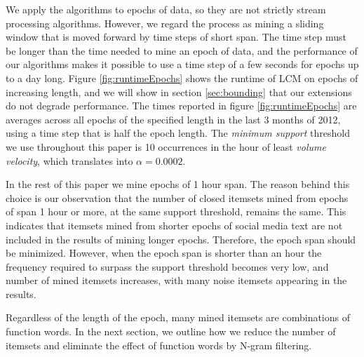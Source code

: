 \documentclass{sig-alternate}
\begin{document}
We apply the algorithms to epochs of data, so they are not strictly stream
processing algorithms.
However, we regard the process as mining a sliding window that is moved
forward by time steps of short span.
The time step must be longer than the time needed to mine an epoch of data,
and the performance of our algorithms makes it possible to use a time step
of a few seconds for epochs up to a day long.
Figure \ref{fig:runtimeEpochs} shows the runtime of LCM on epochs of
increasing length, and we will show in section \ref{sec:bounding} that our
extensions do not degrade performance.
The times reported in figure \ref{fig:runtimeEpochs} are averages across all
epochs of the specified length in the last 3 months of 2012, %
using a time step that is half the epoch length.
The \emph{minimum support} threshold we use throughout this paper
is 10 occurrences in the hour of least \emph{volume velocity},
which translates into $\alpha = 0.0002$.

In the rest of this paper we mine epochs of 1 hour span.
The reason behind this choice is our observation that the number of closed
itemsets mined from epochs of span 1 hour or more,
at the same support threshold, remains the same.
This indicates that itemsets mined from shorter epochs of social media text
are not included in the results of mining longer epochs. 
Therefore, the epoch span should be minimized.
However, when the epoch span is shorter than an hour the frequency required
to surpass the support threshold becomes very low,
and number of mined itemsets increases, with many noise itemsets appearing in
the results.

Regardless of the length of the epoch,
many mined itemsets are combinations of function words.
In the next section, we outline how we reduce the number of itemsets and
eliminate the effect of function words by N-gram filtering.
\end{document}
